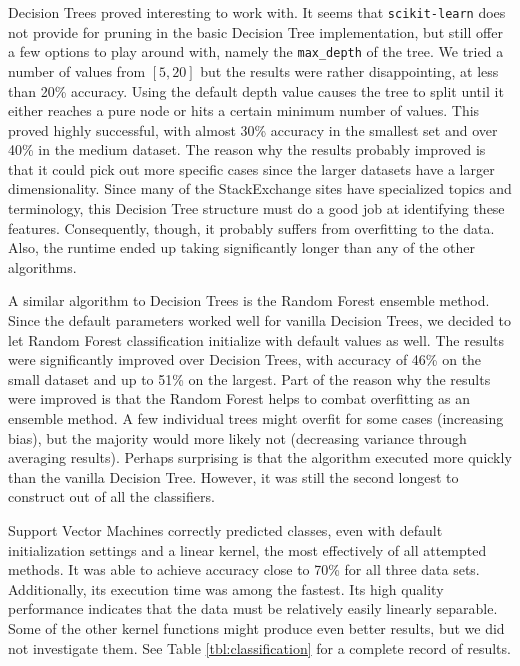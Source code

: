 \documentclass[letterpaper,10pt]{article}
\begin{document}
Decision Trees proved interesting to work with. It seems that
\texttt{scikit-learn} does not provide for pruning in the basic Decision
Tree implementation, but still offer a few options to play around with,
namely the \texttt{max\_depth} of the tree. We tried a number of values
from $[5, 20]$ but the results were rather disappointing, at less than 20\%
accuracy. Using the default depth value causes the tree to split until it
either reaches a pure node or hits a certain minimum number of values. This
proved highly successful, with almost 30\% accuracy in the smallest set and
over 40\% in the medium dataset. The reason why the results probably
improved is that it could pick out more specific cases since the larger
datasets have a larger dimensionality. Since many of the StackExchange
sites have specialized topics and terminology, this Decision Tree structure
must do a good job at identifying these features. Consequently, though, it
probably suffers from overfitting to the data. Also, the runtime ended up
taking significantly longer than any of the other algorithms.

A similar algorithm to Decision Trees is the Random Forest ensemble method.
Since the default parameters worked well for vanilla Decision Trees, we
decided to let Random Forest classification initialize with default values
as well. The results were significantly improved over Decision Trees, with
accuracy of 46\% on the small dataset and up to 51\% on the largest. Part
of the reason why the results were improved is that the Random Forest helps
to combat overfitting as an ensemble method. A few individual trees might
overfit for some cases (increasing bias), but the majority would more
likely not (decreasing variance through averaging results). Perhaps
surprising is that the algorithm executed more quickly than the vanilla
Decision Tree. However, it was still the second longest to construct out
of all the classifiers.

Support Vector Machines correctly predicted classes, even with default
initialization settings and a linear kernel, the most effectively of all
attempted methods. It was able to achieve accuracy close to 70\% for all
three data sets. Additionally, its execution time was among the fastest.
Its high quality performance indicates that the data must be relatively
easily linearly separable. Some of the other kernel functions might produce
even better results, but we did not investigate them. See Table
\ref{tbl:classification} for a complete record of results.
\end{document}
